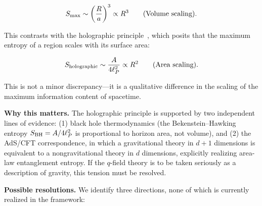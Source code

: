 \documentclass[aps,prd,twocolumn,showpacs,superscriptaddress,preprintnumbers]{revtex4-2}
\begin{document}
\begin{equation}
S_{\rm max} \sim \left(\frac{R}{a}\right)^3 \propto R^3 \qquad \text{(Volume scaling)}.
\label{eq:volume_scaling}
\end{equation}

This contrasts with the holographic principle~\cite{tHooft:1993,Susskind:1994vu}, which posits that the maximum entropy of a region scales with its surface area:

\begin{equation}
S_{\rm holographic} \sim \frac{A}{4\ell_P^2} \propto R^2 \qquad \text{(Area scaling)}.
\label{eq:area_scaling}
\end{equation}

This is not a minor discrepancy---it is a qualitative difference in the scaling of the maximum information content of spacetime.

\textbf{Why this matters.}
The holographic principle is supported by two independent lines of evidence:
(1) black hole thermodynamics (the Bekenstein--Hawking entropy $S_{\rm BH}=A/4\ell_P^2$ is proportional to horizon area, not volume), and
(2) the AdS/CFT correspondence, in which a gravitational theory in $d+1$ dimensions is equivalent to a nongravitational theory in $d$ dimensions, explicitly realizing area-law entanglement entropy.
If the $q$-field theory is to be taken seriously as a description of gravity, this tension must be resolved.

\textbf{Possible resolutions.}
We identify three directions, none of which is currently realized in the framework:
\end{document}
